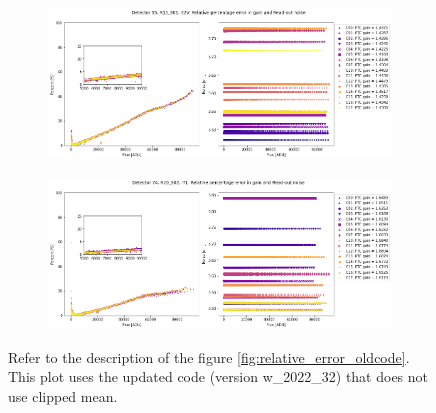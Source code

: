 \begin{figure}[!htb]
     \centering
     \begin{subfigure}[b]{\textwidth}
         \centering
         \includegraphics[width=\textwidth]{Figures/Relative_Error_Gain_Noise_detectorR13_S01.png}
     \end{subfigure}
     \vspace{3mm}
     \begin{subfigure}[b]{\textwidth}
         \centering
         \includegraphics[width=\textwidth]{Figures/Relative_Error_Gain_Noise_detectorR20_S02.png}
     \end{subfigure}
        \caption{Refer to the description of the figure \ref{fig:relative_error_oldcode}. This plot uses the updated code (version w\_2022\_32) that does not use clipped mean.}
        \label{fig:relative_error}
\end{figure}

